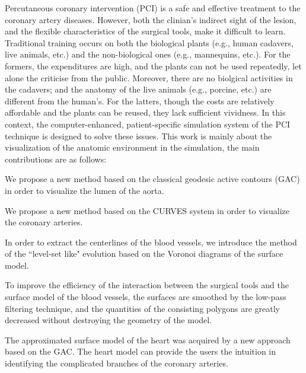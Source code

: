 
\begin{englishabstract}

Percutaneous coronary intervention (PCI) is a safe and effective treatment to the coronary artery diseases.
However, both the clinian's indirect sight of the lesion, and the flexible characteristics of the surgical tools, make it difficult to learn. 
Traditional training occurs on both the biological plants (e.g., human cadavers, live animals, etc.) and the non-biological ones (e.g., mannequins, etc.). 
For the formers, the expenditures are high, and the plants can not be used repeatedly, let alone the criticise from the public. 
Moreover, there are no biolgical activities in the cadavers; and the anatomy of the live animals (e.g., porcine, etc.) are different from the human's.
For the latters, though the costs are relatively affordable and the plants can be reused, they lack sufficient vividness. 
In this context, the computer-enhanced, patient-specific simulation system of the PCI technique is designed to solve these issues. 
This work is mainly about the visualization of the anatomic environment in the simulation, the main contributions are as follows: 

We propose a new method based on the classical geodesic active contours (GAC) in order to visualize the lumen of the aorta. 

We propose a new method based on the CURVES system in order to visualize the coronary arteries. 

In order to extract the centerlines of the blood vessels, we introduce the method of the ``level-set like" evolution based on the Voronoi diagrams of the surface model. 

To improve the efficiency of the interaction between the surgical tools and the surface model of the blood vessels, the surfaces are smoothed by the low-pass filtering technique, and the quantities of the consisting polygons are greatly decreased without destroying the geometry of the model.

The approximated surface model of the heart was acquired by a new approach based on the GAC. 
The heart model can provide the users the intuition in identifying the complicated branches of the coronary arteries. 

%
\end{englishabstract}
